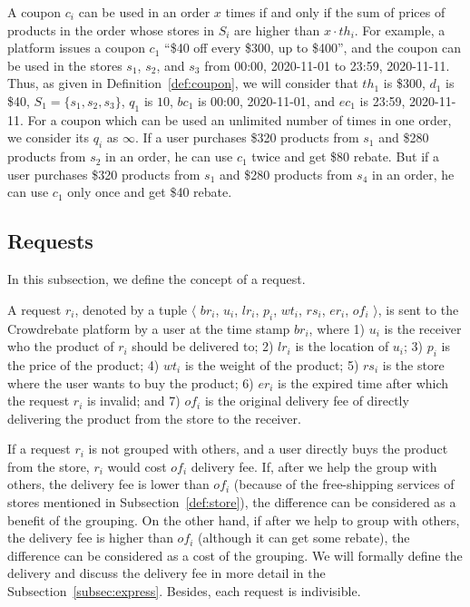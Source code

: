 A coupon $c_i$ can be used in an order $x$ times if and only if the sum of prices of products in the order whose stores in $S_i$ are higher than $x \cdot th_i$. For example, a platform issues a coupon $c_1$ ``\$40 off every \$300, up to \$400'', and the coupon can be used in the stores $s_1$, $s_2$, and $s_3$ from 00:00, 2020-11-01 to 23:59, 2020-11-11. Thus, as given in Definition~\ref{def:coupon}, we will consider that $th_1$ is \$300, $d_1$ is \$40, $S_1=\{s_1,s_2,s_3\}$, $q_1$ is $10$, $bc_1$ is 00:00, 2020-11-01, and $ec_1$ is 23:59, 2020-11-11. For a coupon which can be used an unlimited number of times in one order, we consider its $q_i$ as $\infty$. If a user purchases \$320 products from $s_1$ and \$280 products from $s_2$ in an order, he can use $c_1$ twice and get \$80 rebate. But if a user purchases \$320 products from $s_1$ and \$280 products from $s_4$ in an order, he can use $c_1$ only once and get \$40 rebate.

\subsection{Requests}
\label{subsec:request}
In this subsection, we define the concept of a request.
	
\begin{definition}[A request]
	\label{def:request}
	A request $r_i$, denoted by a tuple $\langle$ $br_i$, $u_i$, $lr_i$, $p_i$, $wt_i$, $rs_i$, $er_i$, $of_i$ $\rangle$, is sent to the Crowdrebate platform by a user at the time stamp $br_i$, where 1) $u_i$ is the receiver who the product of $r_i$ should be delivered to; 2) $lr_i$ is the location of $u_i$; 3) $p_i$ is the price of the product; 4) $wt_i$ is the weight of the product; 5) $rs_i$ is the store where the user wants to buy the product; 6) $er_i$ is the expired time after which the request $r_i$ is invalid; and 7) $of_i$ is the original delivery fee of directly delivering the product from the store to the receiver.
\end{definition}

If a request $r_i$ is not grouped with others, and a user directly buys the product from the store, $r_i$ would cost $of_i$ delivery fee. If, after we help the group with others, the delivery fee is lower than $of_i$ (because of the free-shipping services of stores mentioned in Subsection~\ref{def:store}), the difference can be considered as a benefit of the grouping. On the other hand, if after we help to group with others, the delivery fee is higher than $of_i$ (although it can get some rebate), the difference can be considered as a cost of the grouping. We will formally define the delivery and discuss the delivery fee in more detail in the Subsection~\ref{subsec:express}. Besides, each request is indivisible. 

